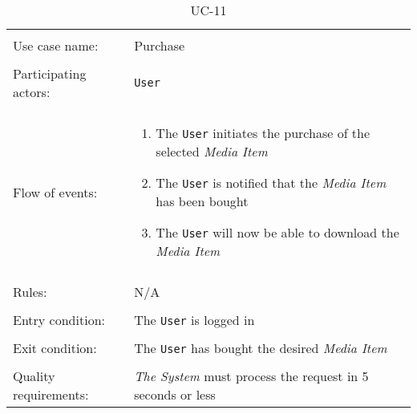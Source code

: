 \noindent
\begin{table}[h!]
\caption{UC-11}
\label{UC-11}
\centering
\begin{tabular}{ l p{8cm} }   
\hline             
\\
Use case name:  & Purchase   \\   \hline \\                
Participating actors:  & \texttt{User} \\   \hline \\         
Flow of events: & \begin{enumerate}
\item{The \texttt{User} initiates the purchase of the selected \textit{Media Item}}
\item{The \texttt{User} is notified that the \textit{Media Item} has been bought}
\item{The \texttt{User} will now be able to download the \textit{Media Item}}
\end{enumerate}
\\
\hline \\
Rules: & N/A \\ \hline \\
Entry condition: & The \texttt{User} is logged in \\ \hline \\
Exit condition: & The \texttt{User} has bought the desired \textit{Media Item} \\ \hline \\
Quality requirements: & \textit{The System} must process the request in 5 seconds or less \\ \hline             
\end{tabular} \\
\end{table}
